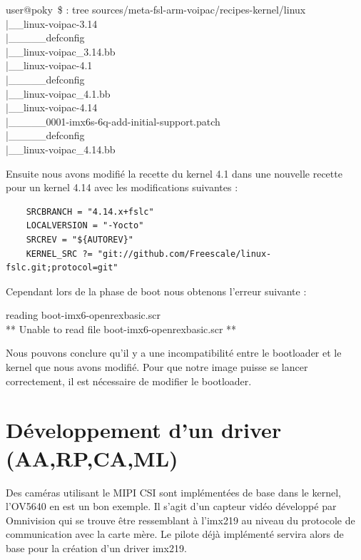 {\begin{tcolorbox}
    user@poky~\$ : tree sources/meta-fsl-arm-voipac/recipes-kernel/linux \\
    |\_\_linux-voipac-3.14 \\
    |\_\_\_\_\_defconfig \\
    |\_\_linux-voipac\_3.14.bb \\
    |\_\_linux-voipac-4.1 \\
    |\_\_\_\_\_defconfig \\
    |\_\_linux-voipac\_4.1.bb \\
    |\_\_linux-voipac-4.14 \\
    |\_\_\_\_\_0001-imx6s-6q-add-initial-support.patch \\
    |\_\_\_\_\_defconfig \\
    |\_\_linux-voipac\_4.14.bb \\
\end{tcolorbox}

Ensuite nous avons modifié la recette du kernel 4.1 dans une nouvelle recette pour un
kernel 4.14 avec les modifications suivantes :

\begin{lstlisting}
    SRCBRANCH = "4.14.x+fslc"
    LOCALVERSION = "-Yocto"
    SRCREV = "${AUTOREV}"
    KERNEL_SRC ?= "git://github.com/Freescale/linux-fslc.git;protocol=git"
\end{lstlisting}

Cependant lors de la phase de boot nous obtenons l’erreur suivante :

\begin{tcolorbox}
    reading boot-imx6-openrexbasic.scr \\
    ** Unable to read file boot-imx6-openrexbasic.scr **
\end{tcolorbox}

Nous pouvons conclure qu’il y a une incompatibilité entre le bootloader et le kernel que
nous avons modifié. Pour que notre image puisse se lancer correctement, il est nécessaire
de modifier le bootloader.

\section{Développement d'un driver (AA,RP,CA,ML)}

Des caméras utilisant le MIPI CSI sont implémentées de base dans le kernel, l’OV5640 en
est un bon exemple. Il s’agit d’un capteur vidéo développé par Omnivision qui se trouve
être ressemblant à l’imx219 au niveau du protocole de communication avec la carte mère.
Le pilote déjà implémenté servira alors de base pour la création d’un driver imx219.

}
